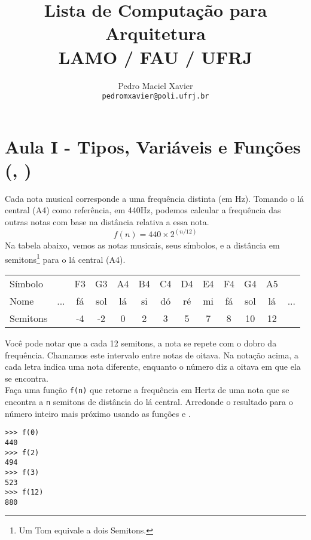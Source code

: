 \documentclass[12pt]{article}
\title{%
Lista de Computação para Arquitetura\\
{\normalsize LAMO / FAU / UFRJ}
}
\author{%
Pedro Maciel Xavier \\ 
\texttt{pedromxavier@poli.ufrj.br}
}
\date{}
\begin{document}
	\maketitle
	
	\tableofcontents
	
	\cc
	
	\pagebreak
	
	
	\section{Aula I - Tipos, Variáveis e Funções \\ (, )}
	
	
	Cada nota musical corresponde a uma frequência distinta (em Hz). Tomando o lá central (A4) como referência, em 440Hz, podemos calcular a frequência das outras notas com base na distância relativa a essa nota.
	$$f(n) = 440 \times 2^{(n/12)}$$
	Na tabela abaixo, vemos as notas musicais, seus símbolos, e a distância em semitons\footnote{Um Tom equivale a dois Semitons.} para o lá central (A4).
	
	\begin{center}
		\begin{tabular}{|l|c c c c c c c c c c c c|}
			\hline
			Símbolo &  & F3 & G3 & A4 & B4 & C4 & D4 & E4 & F4 & G4 & A5 & \\
			Nome & ... & fá & sol & lá & si & dó & ré & mi & fá & sol & lá & ... \\
			Semitons &  & -4 & -2 & 0 & 2 & 3 & 5 & 7 & 8 & 10 & 12 & \\
			\hline
		\end{tabular}
	\end{center}

	Você pode notar que a cada 12 semitons, a nota se repete com o dobro da frequência. Chamamos este intervalo entre notas de oitava. Na notação acima, a cada letra indica uma nota diferente, enquanto o número diz a oitava em que ela se encontra.\\
	
	\quest Faça uma função \texttt{f(n)} que retorne a frequência em Hertz de uma nota que se encontra a \texttt{n} semitons de distância do lá central. Arredonde o resultado para o número inteiro mais próximo usando as funções  e .\\
	
	\example 
	\begin{lstlisting}
>>> f(0)
440
>>> f(2)
494
>>> f(3)
523
>>> f(12)
880
	\end{lstlisting}
	
\end{document}
